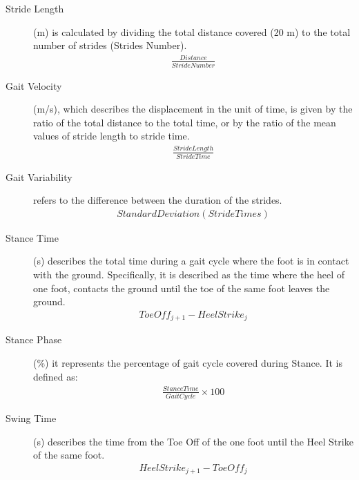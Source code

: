 \begin{description}
\item[Stride Length] 
 (m) is calculated by dividing the total distance covered (20 m) to the total number of strides (Strides Number).
\begin{equation}
\begin{aligned}
\frac{Distance}{Stride Number}
\end{aligned}
\end{equation}
 
\item[Gait Velocity] 
 (m/s), which describes the displacement in the unit of time, is given by the ratio of the total distance to the total time, or by the ratio of the mean values of stride length to stride time.
\begin{equation}
\begin{aligned}
\frac{Stride Length}{Stride Time}
\end{aligned}
\end{equation}

\item[Gait Variability] 
 refers to the difference between the duration of the strides.
\begin{equation}
\begin{aligned}
Standard Deviation(Stride Times)
\end{aligned}
\end{equation}

 \item[Stance Time] 
 (s) describes the total time during a gait cycle where the foot is in contact with the ground. 
Specifically, it is described as the time where the heel of one foot, contacts the ground until the toe of the same foot 
leaves the ground.
\begin{equation}
\begin{aligned}
Toe Off_{j+1}-Heel Strike_{j}
\end{aligned}
\end{equation}

\item[Stance Phase] (\%) it represents the percentage of gait cycle covered during Stance. It is defined as:
\begin{equation}
\begin{aligned}
\frac{Stance Time}{Gait Cycle} \times 100
\end{aligned}
\end{equation}

\item[Swing Time] 
 (s) describes the time from the Toe Off of the one foot until the Heel Strike of the same foot.
\begin{equation}
\begin{aligned}
Heel Strike_{j+1}-Toe Off_{j}
\end{aligned}
\end{equation}


\end{description}
